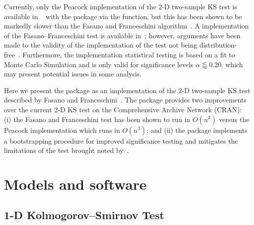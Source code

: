 \documentclass[codesnippet]{jss}
\newcommand{\fct}[1]{\code{#1()}}
\begin{document}
Currently, only the Peacock implementation of the 2-D two-sample KS
test is available in ~\citep{R} with the
 package via the \fct{peacock2} function, but this
has been shown to be markedly slower than the Fasano and Franceschini
algorithm~\citep{Lopes2007}. A  implementation of the
Fasano--Franceschini test is available in~\cite{numericalRecipes};
however, arguments have been made to the validity of the
implementation of the test not being
distribution-free~\citep{Babu2006}. Furthermore, the 
implementation statistical testing is based on a fit to Monte Carlo
Simulation and is only valid for significance levels $\alpha \lessapprox 0.20$, 
which may present potential issues in some analysis.

Here we present the  package as an
 implementation of the 2-D two-sample KS test described
by Fasano and Franceschini~\citep{Fasano1987}. The
 package provides two improvements over
the current 2-D KS test on the Comprehensive  Archive
Network (CRAN): (i) the Fasano and Franceschini test has been shown to
run in $O(n^2)$ versus the Peacock implementation which runs in
$O(n^3)$; and (ii) the package implements a bootstrapping procedure
for improved significance testing and mitigates the limitations of
the test brought noted by~\citep{Babu2006}.

\section{Models and software} \label{sec:models}

\subsection{1-D Kolmogorov--Smirnov Test}
\end{document}
